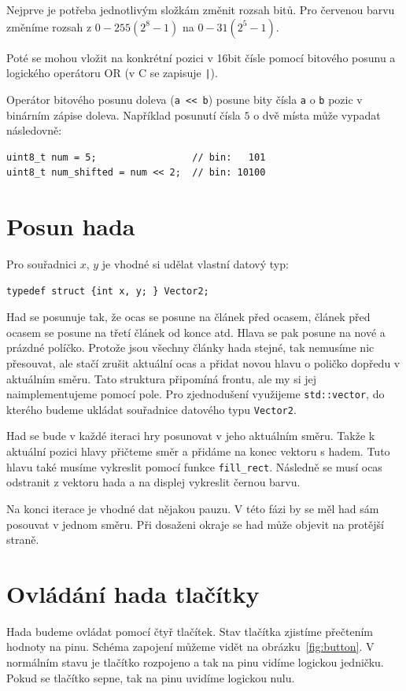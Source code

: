 \documentclass[12pt]{article}
\begin{document}
Nejprve je potřeba jednotlivým složkám změnit rozsah bitů.
Pro červenou barvu změníme rozsah z $0 - 255 (2^8-1)$ na $0 - 31 (2^{5}-1)$.

Poté se mohou vložit na konkrétní pozici v 16bit čísle pomocí bitového posunu a logického operátoru OR (v C se zapisuje \texttt{|}).

Operátor bitového posunu doleva (\texttt{a << b}) posune bity čísla \texttt{a} o \texttt{b} pozic v binárním zápise doleva.
Například posunutí čísla $5$ o dvě místa může vypadat následovně:
\begin{verbatim}
uint8_t num = 5;                 // bin:   101
uint8_t num_shifted = num << 2;  // bin: 10100
\end{verbatim}


\section{Posun hada}
Pro souřadnici $x$, $y$ je vhodné si udělat vlastní datový typ:
\begin{verbatim}
typedef struct {int x, y; } Vector2;
\end{verbatim}

Had se posunuje tak, že ocas se posune na článek před ocasem, článek před ocasem se posune na třetí článek od konce atd.
Hlava se pak posune na nové a prázdné políčko.
Protože jsou všechny články hada stejné, tak nemusíme nic přesouvat, ale stačí zrušit aktuální ocas a přidat novou hlavu o poličko dopředu v aktuálním směru.
Tato struktura připomíná frontu, ale my si jej naimplementujeme pomocí pole.
Pro zjednodušení využijeme \texttt{std::vector}, do kterého budeme ukládat souřadnice datového typu \texttt{Vector2}.

Had se bude v každé iteraci hry posunovat v jeho aktuálním směru.
Takže k aktuální pozici hlavy přičteme směr a přidáme na konec vektoru s hadem.
Tuto hlavu také musíme vykreslit pomocí funkce \texttt{fill_rect}.
Následně se musí ocas odstranit z vektoru hada a na displej vykreslit černou barvu.

Na konci iterace je vhodné dat nějakou pauzu.
V této fázi by se měl had sám posouvat v jednom směru.
Při dosaženi okraje se had může objevit na protější straně.

\section{Ovládání hada tlačítky}
Hada budeme ovládat pomocí čtyř tlačítek.
Stav tlačítka zjistíme přečtením hodnoty na pinu.
Schéma zapojení můžeme vidět na obrázku~\ref{fig:button}.
V normálním stavu je tlačítko rozpojeno a tak na pinu vidíme logickou jedničku.
Pokud se tlačítko sepne, tak na pinu uvidíme logickou nulu.
\end{document}
